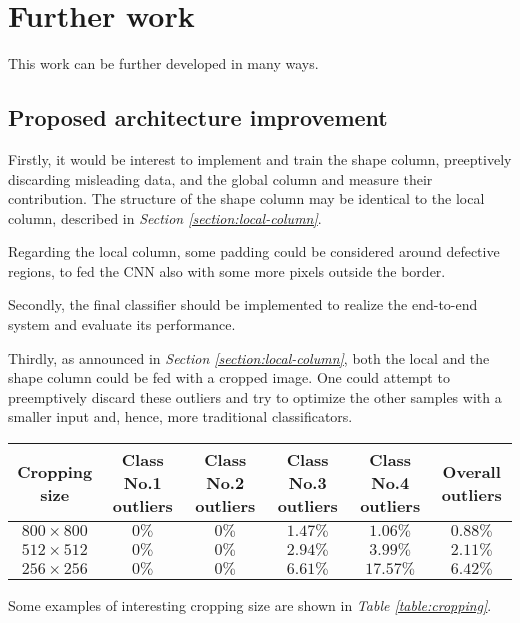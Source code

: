 \section{Further work}\label{section:further-work}
    \par{
        This work can be further developed in many ways.
    }
    \subsection{Proposed architecture improvement}
    \par{
        Firstly, it would be interest to implement and train the shape column, preeptively discarding misleading data, and the global column and measure their contribution. The structure of the shape column may be identical to the local column, described in \emph{Section \ref{section:local-column}}.
    }
    \par{
        Regarding the local column, some padding could be considered around defective regions, to fed the CNN also with some more pixels outside the border.
    }
    \par{
        Secondly, the final classifier should be implemented to realize the end-to-end system and evaluate its performance.
    }
    \par{
        Thirdly, as announced in \emph{Section \ref{section:local-column}}, both the local and the shape column could be fed with a cropped image. One could attempt to preemptively discard these outliers and try to optimize the other samples with a smaller input and, hence, more traditional classificators.
    }
    \begin{table*}
        \centering
        \normalsize
        \begin{tabular}{|c|c|c|c|c|c|}
            \hline
            \textbf{Cropping size} & \textbf{Class No.1 outliers} & \textbf{Class No.2 outliers}& \textbf{Class No.3 outliers} & \textbf{Class No.4 outliers} & \textbf{Overall outliers}\\\hline
            $800\times 800$ & $0\%$ & $0\%$ & $1.47\%$ & $1.06\%$ & $0.88\%$\\
            $512\times 512$ & $0\%$ & $0\%$ & $2.94\%$ & $3.99\%$ & $2.11\%$\\
            $256\times 256$ & $0\%$ & $0\%$ & $6.61\%$ & $17.57\%$& $6.42\%$\\
            \hline
        \end{tabular}
        \vspace{0.5cm}
        \caption{Cropping examples.}\label{table:cropping}
    \end{table*}
    \par{
        Some examples of interesting cropping size are shown in \emph{Table \ref{table:cropping}}.
    }
